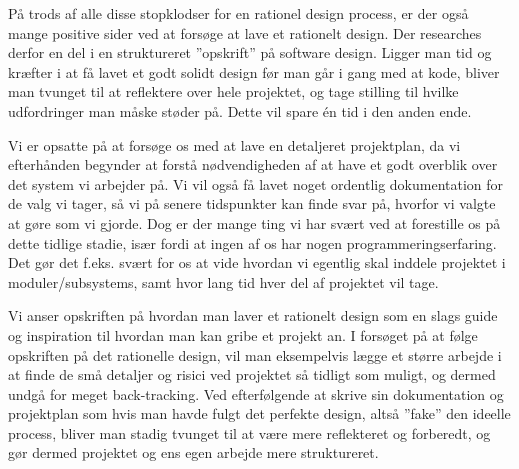 \documentclass[12pt,a4paper]{article}
\begin{document}
På trods af alle disse stopklodser for en rationel design process, er der også mange positive sider ved at forsøge at lave et rationelt design. Der researches derfor en del i en struktureret ”opskrift” på software design.
Ligger man tid og kræfter i at få lavet et godt solidt design før man går i gang med at kode, bliver man tvunget til at reflektere over hele projektet, og tage stilling til hvilke udfordringer man måske støder på. Dette vil spare én tid i den anden ende.

Vi er opsatte på at forsøge os med at lave en detaljeret projektplan, da vi efterhånden begynder at forstå nødvendigheden af at have et godt overblik over det system vi arbejder på. Vi vil også få lavet noget ordentlig dokumentation for de valg vi tager, så vi på senere tidspunkter kan finde svar på, hvorfor vi valgte at gøre som vi gjorde. 
Dog er der mange ting vi har svært ved at forestille os på dette tidlige stadie, især fordi at ingen af os har nogen programmeringserfaring. Det gør det f.eks. svært for os at vide hvordan vi egentlig skal inddele projektet i moduler/subsystems, samt hvor lang tid hver del af projektet vil tage.

Vi anser opskriften på hvordan man laver et rationelt design som en slags guide og inspiration til hvordan man kan gribe et projekt an. I forsøget på at følge opskriften på det rationelle design, vil man eksempelvis lægge et større arbejde i at finde de små detaljer og risici ved projektet så tidligt som muligt, og dermed undgå for meget back-tracking.
Ved efterfølgende at skrive sin dokumentation og projektplan som hvis man havde fulgt det perfekte design, altså ”fake” den ideelle process, bliver man stadig tvunget til at være mere reflekteret og forberedt, og gør dermed projektet og ens egen arbejde mere struktureret. 
\end{document}
